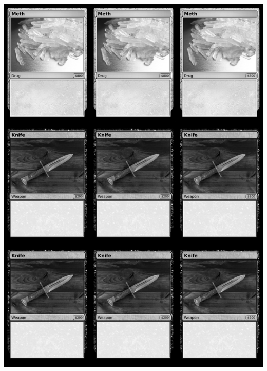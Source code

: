 \documentclass[a4paper]{article}
\begin{document}
\begin{center}
	\centering
	\includegraphics[width=190.5mm,height=266.7mm]{output/temp/page5.png}
\end{center}

\newpage
\end{document}
